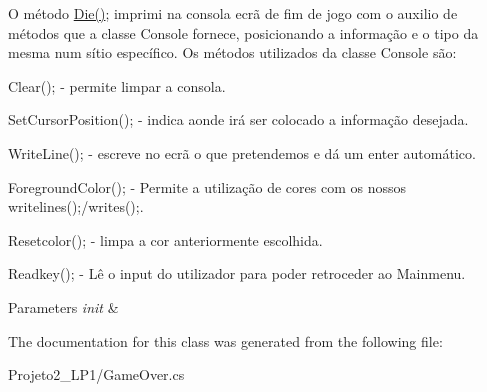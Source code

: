O método \mbox{\hyperlink{class_projeto2___l_p1_1_1_game_over_ae6d3127c1715618a0368e441fdd095f7}{Die()}}; imprimi na consola ecrã de fim de jogo com o auxilio de métodos que a classe Console fornece, posicionando a informação e o tipo da mesma num sítio específico. Os métodos utilizados da classe Console são\+: 


\begin{DoxyItemize}
\item Clear(); -\/ permite limpar a consola.
\item Set\+Cursor\+Position(); -\/ indica aonde irá ser colocado a informação desejada.
\item Write\+Line(); -\/ escreve no ecrã o que pretendemos e dá um enter automático.
\item Foreground\+Color(); -\/ Permite a utilização de cores com os nossos writelines();/writes();.
\item Resetcolor(); -\/ limpa a cor anteriormente escolhida.
\item Readkey(); -\/ Lê o input do utilizador para poder retroceder ao Mainmenu. 
\end{DoxyItemize}


\begin{DoxyParams}{Parameters}
{\em init} & \\
\hline
\end{DoxyParams}


The documentation for this class was generated from the following file\+:\begin{DoxyCompactItemize}
\item 
Projeto2\+\_\+\+L\+P1/Game\+Over.\+cs\end{DoxyCompactItemize}
